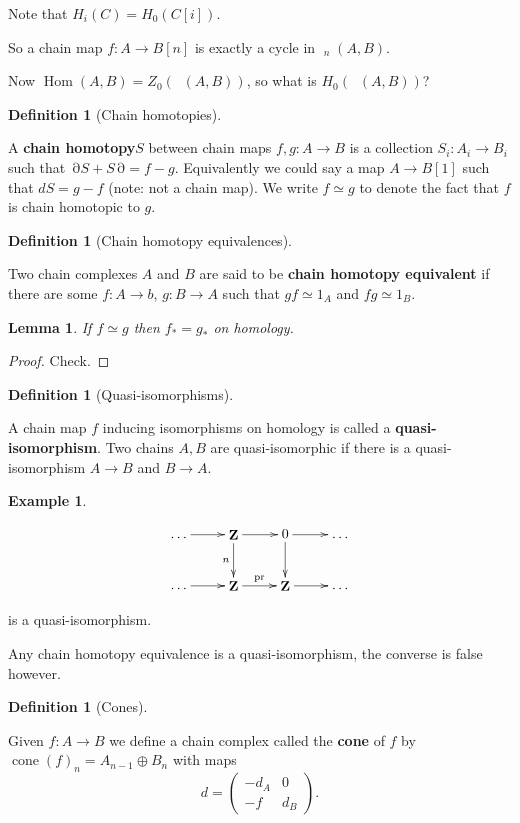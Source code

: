 \documentclass[10pt,]{book}
\newcommand{\terminology}[1]{\textbf{#1}}
\theoremstyle{plain}
\newtheorem{lemma}[theorem]{Lemma}
\theoremstyle{definition}
\newtheorem{definition}[theorem]{Definition}
\newtheorem{example}[theorem]{Example}
\numberwithin{equation}{section}
\renewenvironment{figure}%
{\begin{mbxfigure}\setcounter{mbxfigure}{\value{theorem}}\stepcounter{theorem}}%
{\end{mbxfigure}}
\DeclareMathOperator{\Hom}{Hom}
\DeclareMathOperator{\cHom}{\underline{Hom}}
\DeclareMathOperator{\cone}{cone}
\DeclareMathOperator{\ZZ}{\mathbf{Z}}
\DeclareMathOperator{\dd}{\partial}
\begin{document}
\par
Note that \(H_i(C) = H_0(C[i])\).%
\par
So a chain map \(f\colon A \to B[n]\) is exactly a cycle in \(\cHom_n(A,B)\).%
\par
Now \(\Hom(A,B) = Z_0(\cHom(A,B))\), so what is \(H_0(\cHom(A,B))\)?%
\begin{definition}[Chain homotopies]\label{definition-12}

            A \terminology{chain homotopy}\(S\) between chain maps \(f,g\colon A \to B\) is a collection \(S_i \colon A_i \to B_i\) such that \(\dd S + S\dd = f-g\).
            Equivalently we could say a map \(A \to B[1]\) such that \(dS = g -f\) (note: not a chain map).
            We write \(f \simeq g\) to denote the fact that \(f\) is chain homotopic to \(g\).
          \end{definition}
\begin{definition}[Chain homotopy equivalences]\label{definition-13}

            Two chain complexes \(A\) and \(B\) are said to be \terminology{chain homotopy equivalent} if there are some \(f\colon A\to b\), \(g\colon B \to A\) such that \(gf \simeq 1_A\) and \(fg\simeq 1_B\).
          \end{definition}
\begin{lemma}\label{lemma-2}
If \(f\simeq g\) then \(f_* = g_*\) on homology.\end{lemma}
\begin{proof}
Check.\end{proof}
\begin{definition}[Quasi-isomorphisms]\label{definition-14}

            A chain map \(f\) inducing isomorphisms on homology is called a \terminology{quasi-isomorphism}.
            Two chains \(A,B\) are quasi-isomorphic if there is a quasi-isomorphism \(A \to B\) and \(B\to A\).
          \end{definition}
\begin{example}\label{example-6}
\begin{figure}
\centering
\[
                \xymatrix{
                  \dots\ar[r] &\ZZ \ar[r]\ar[d]_n &0 \ar[r]\ar[d] &\dots \\
                  \dots\ar[r] &\ZZ \ar[r]^{\text{pr}} &\ZZ \ar[r] &\dots
                }
              \]\end{figure}

            is a quasi-isomorphism.
          \end{example}
\par
Any chain homotopy equivalence is a quasi-isomorphism, the converse is false however.%
\begin{definition}[Cones]\label{definition-15}

            Given \(f\colon A \to B\) we define a chain complex called the \terminology{cone} of \(f\) by \(\cone(f)_n = A_{n-1} \oplus B_n\) with maps \[d = \begin{pmatrix}-d_A & 0 \\ -f & d_B\end{pmatrix}.\]\end{definition}
\par
\end{document}
